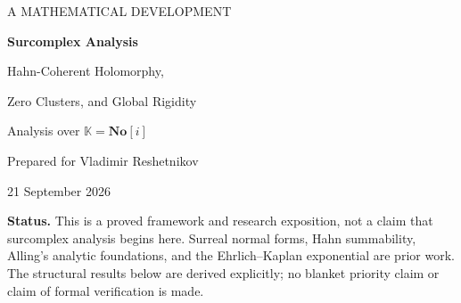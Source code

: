 \documentclass[11pt,oneside]{article}
\numberwithin{equation}{section}
\theoremstyle{definition}
\theoremstyle{remark}\newtheorem{remark}[theorem]{Remark}
\newcommand{\No}{\mathbf{No}}
\newcommand{\K}{\mathbb K}
\newcommand{\C}{\mathbb C}
\newcommand{\Exp}{\operatorname{Exp}}
\begin{document}
\begin{titlepage}
\vspace*{16mm}
{\sffamily\small\color{accent} A MATHEMATICAL DEVELOPMENT}\par
\vspace{8mm}
{\Huge\bfseries\color{ink} Surcomplex Analysis}\par
\vspace{5mm}
{\Large Hahn-Coherent Holomorphy,\par Zero Clusters, and Global Rigidity}\par
\vspace{11mm}
{\large Analysis over $\K=\No[i]$}\par
\vspace{5mm}
{\normalsize Prepared for Vladimir Reshetnikov\par 21 September 2026}
\vspace{12mm}
\begin{abstract}
The algebraic closure of the surreal numbers supports a substantial complex
analysis, but not by replacing $\C$ with $\No[i]$ in classical definitions
without further changes. We separate three structures: the full surreal
order topology, infinitesimal formal evaluation, and a coherent analytic
structure obtained from Hahn series with ordinary holomorphic coefficients.
For the coherent structure we prove Taylor and Cauchy formulas, Morera's
criterion, existence and uniqueness of primitives, a residue theorem,
Hahn--Weierstrass preparation, an exact zero-cluster theorem, an argument
principle, and local open and inverse mapping theorems. Infinitesimal
perturbations may involve arbitrary set-sized well-ordered surreal scales,
not just one formal parameter.

We also prove a global rigidity theorem: a function admitting a coherent
Hahn representation on every surreal dilation of a fixed ordinary disk is
a polynomial. We give a normal-form construction of the known canonical
surcomplex exponential, exhibit explicit noncanonical exponentials with
the same local differential equation, and establish a Picard-type
value-distribution theorem for $\Exp(1/z)$. Counterexamples identify exactly
why unrestricted identity, maximum-modulus, and Liouville statements fail.
All infinite sums and contour operations are assigned explicit meanings;
none is silently interpreted as a limit of ordinary partial sums.
\end{abstract}
\vfill
\noindent\small\textbf{Status.} This is a proved framework and research exposition, not a claim
that surcomplex analysis begins here. Surreal normal forms, Hahn summability,
Alling's analytic foundations, and the Ehrlich--Kaplan exponential are prior
work. The structural results below are derived explicitly; no blanket
priority claim or claim of formal verification is made.
\end{titlepage}
\tableofcontents
\newpage
\end{document}
